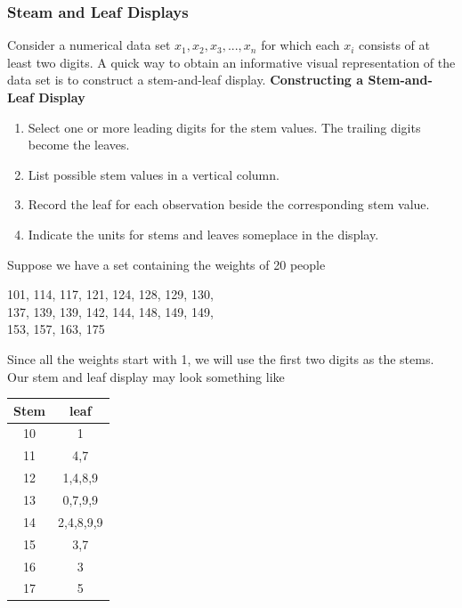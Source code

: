\documentclass{report}
\begin{document}
\subsubsection{Steam and Leaf Displays}
\bigbreak \noindent 
Consider a numerical data set $x_{1},x_{2},x_{3},...,x_{n}$ for which each $x_{i}$ consists of at least two
digits. A quick way to obtain an informative visual representation of the data set is
to construct a stem-and-leaf display.
\bigbreak \noindent 
\textbf{Constructing a Stem-and-Leaf Display}
\begin{enumerate}
    \item Select one or more leading digits for the stem values. The trailing digits become the leaves.
    \item List possible stem values in a vertical column.
    \item Record the leaf for each observation beside the corresponding stem value.
    \item Indicate the units for stems and leaves someplace in the display.
\end{enumerate}
\bigbreak \noindent 
Suppose we have a set containing the weights of 20 people
\bigbreak \noindent 
\begin{center}
    101, 114, 117, 121, 124, 128, 129, 130,  \\
    137, 139, 139, 142, 144, 148, 149, 149,  \\
    153, 157, 163, 175
\end{center}
\bigbreak \noindent 
Since all the weights start with 1, we will use the first two digits as the stems. Our stem and leaf display may look something like
\bigbreak \noindent 
\begin{center}
    \begin{tabular}{c|c}
        Stem & leaf \\
        \hline
        10 & 1\\
        11 & 4,7\\
        12 & 1,4,8,9\\ 
        13 & 0,7,9,9\\
        14 & 2,4,8,9,9\\
        15 &3,7\\
        16 &3\\
        17&5
    \end{tabular}
\end{center}

\pagebreak 
\end{document}
